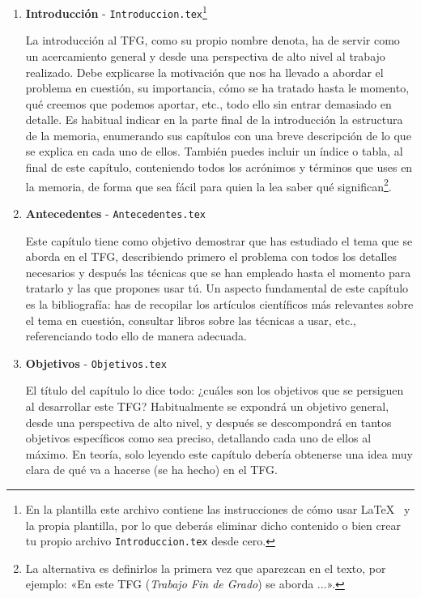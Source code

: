 \begin{enumerate}
    \item \textbf{Introducción} - \texttt{Introduccion.tex}\footnote{En la plantilla este archivo contiene las instrucciones de cómo usar \LaTeX~ y la propia plantilla, por lo que deberás eliminar dicho contenido o bien crear tu propio archivo \texttt{Introduccion.tex} desde cero.} \par
    La introducción al TFG, como su propio nombre denota, ha de servir como un acercamiento general y desde una perspectiva de alto nivel al trabajo realizado. Debe explicarse la motivación que nos ha llevado a abordar el problema en cuestión, su importancia, cómo se ha tratado hasta le momento, qué creemos que podemos aportar, etc., todo ello sin entrar demasiado en detalle. Es habitual indicar en la parte final de la introducción la estructura de la memoria, enumerando sus capítulos con una breve descripción de lo que se explica en cada uno de ellos. También puedes incluir un índice o tabla, al final de este capítulo, conteniendo todos los acrónimos y términos que uses en la memoria, de forma que sea fácil para quien la lea saber qué significan\footnote{La alternativa es definirlos la primera vez que aparezcan en el texto, por ejemplo: «En este TFG (\textit{Trabajo Fin de Grado}) se aborda ...».}.
    
    \item \textbf{Antecedentes} - \texttt{Antecedentes.tex} \par
    Este capítulo tiene como objetivo demostrar que has estudiado el tema que se aborda en el TFG, describiendo primero el problema con todos los detalles necesarios y después las técnicas que se han empleado hasta el momento para tratarlo y las que propones usar tú. Un aspecto fundamental de este capítulo es la bibliografía: has de recopilar los artículos científicos más relevantes sobre el tema en cuestión, consultar libros sobre las técnicas a usar, etc., referenciando todo ello de manera adecuada.
    
    \item \textbf{Objetivos} - \texttt{Objetivos.tex} \par
    El título del capítulo lo dice todo: ¿cuáles son los objetivos que se persiguen al desarrollar este TFG? Habitualmente se expondrá un objetivo general, desde una perspectiva de alto nivel, y después se descompondrá en tantos objetivos específicos como sea preciso, detallando cada uno de ellos al máximo. En teoría, solo leyendo este capítulo debería obtenerse una idea muy clara de qué va a hacerse (se ha hecho) en el TFG.
    

\end{enumerate}
